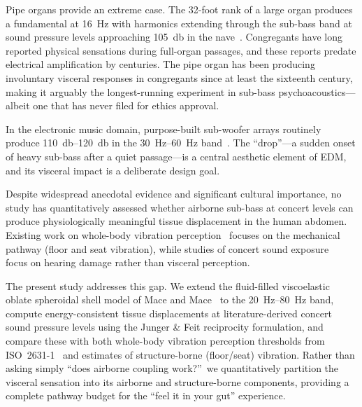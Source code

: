 Pipe organs provide an extreme case.  The 32-foot rank of a large organ
produces a fundamental at \SI{16}{\hertz} with harmonics extending
through the sub-bass band at sound pressure levels approaching
\SI{105}{\decibel} in the nave~\cite{Bickerdike1966}.  Congregants have
long reported physical sensations during full-organ passages, and these
reports predate electrical amplification by centuries.
The pipe organ has been producing involuntary visceral responses in
congregants since at least the sixteenth century, making it arguably the
longest-running experiment in sub-bass psychoacoustics---albeit one that
has never filed for ethics approval.

In the electronic music domain, purpose-built sub-woofer arrays routinely
produce \SIrange{110}{120}{\decibel} in the \SIrange{30}{60}{\hertz}
band~\cite{Opperman2006}.  The ``drop''---a sudden onset of heavy
sub-bass after a quiet passage---is a central aesthetic element of EDM,
and its visceral impact is a deliberate design goal.

Despite widespread anecdotal evidence and significant cultural
importance, no study has quantitatively assessed whether airborne
sub-bass at concert levels can produce physiologically meaningful tissue
displacement in the human abdomen.  Existing work on whole-body vibration
perception~\cite{Griffin1990, Mansfield2005} focuses on the mechanical
pathway (floor and seat vibration), while studies of concert sound
exposure~\cite{Gunderson2016, Opperman2006} focus on hearing damage
rather than visceral perception.

The present study addresses this gap.  We extend the fluid-filled
viscoelastic oblate spheroidal shell model of Mace and
Mace~\cite{Mace2026browntone} to the \SIrange{20}{80}{\hertz} band,
compute energy-consistent tissue displacements at literature-derived
concert sound pressure levels using the Junger \& Feit reciprocity
formulation, and compare these with both whole-body vibration perception
thresholds from ISO~2631-1~\cite{iso2631} and estimates of
structure-borne (floor/seat) vibration.  Rather than asking simply
``does airborne coupling work?''\ we quantitatively partition the
visceral sensation into its airborne and structure-borne components,
providing a complete pathway budget for the ``feel it in your gut''
experience.
